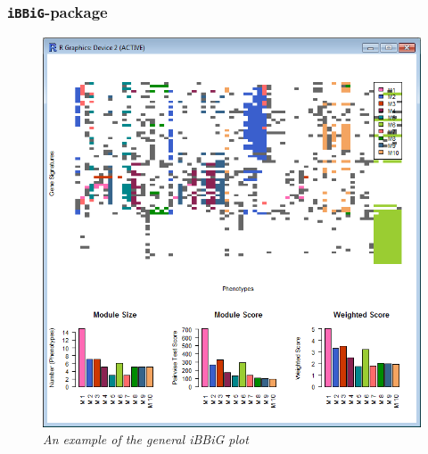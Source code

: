 \documentclass[a4paper]{article}\usepackage[]{graphicx}\usepackage[]{color}
\begin{document}
\subsubsection{\texttt{iBBiG}-package}
\begin{figure}[H]
\centering
\includegraphics[scale=0.5]{figures/ibbig_example1.png}
\caption{{\it An example of the general iBBiG plot}\label{ibbig_example1}}
\end{figure}
\end{document}
